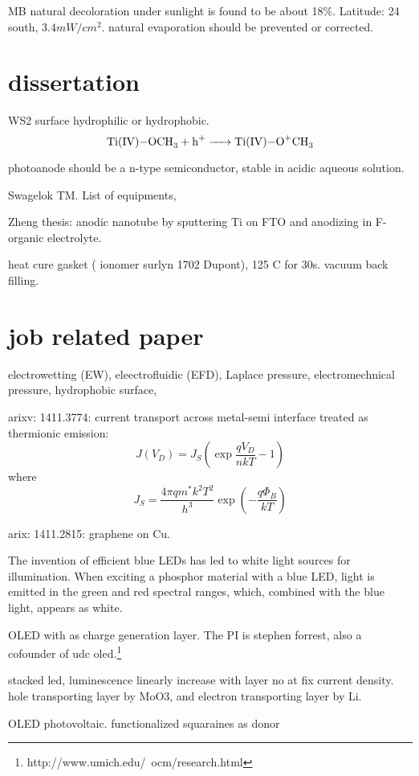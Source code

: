 MB natural decoloration under sunlight is found to be about 18\%.\cite{Nogueira1993} Latitude: 24 south, $3.4mW/cm^2$. natural evaporation should be prevented or corrected.

\section{dissertation}

WS2 surface hydrophilic or hydrophobic.
\[
\cee{Ti(IV)-OCH3 + h^+ -> Ti(IV)-O^+CH3}
\]

 photoanode should be a n-type semiconductor, stable in acidic aqueous solution.

Swagelok TM. List of equipments,

Zheng thesis:  anodic nanotube by sputtering Ti on FTO and anodizing in F-organic electrolyte.

heat cure gasket ( ionomer surlyn 1702 Dupont), 125 C for 30s.
vacuum back filling.



\section{job related paper}

electrowetting (EW), eleectrofluidic (EFD), Laplace pressure, electromechnical pressure, hydrophobic surface, \cite{Yang2010a}

arixv: 1411.3774: current transport across metal-semi interface treated as thermionic emission:
\[
J(V_D) = J_S(\exp\frac{qV_D}{nkT}-1)
\]
where 
\[
J_S = \frac{4\pi q m^* k^2T^2}{h^3}\exp(-\frac{q\Phi_B}{kT})
\]

arix: 1411.2815: graphene on Cu. 


The invention of efficient blue LEDs has led to white light sources for illumination. When exciting a phosphor material with a blue LED, light is emitted in the green and red spectral ranges, which, combined with the blue light, appears as white. 


OLED with  as charge generation layer. \cite{Kanno2006} The PI is stephen forrest, also a cofounder of udc oled.\footnote{http://www.umich.edu/~ocm/research.html}

stacked led, luminescence linearly increase with layer no at fix current density. hole transporting layer by MoO3, and electron transporting layer by Li.

OLED photovoltaic.\cite{Xiao2012a} functionalized squaraines as donor

